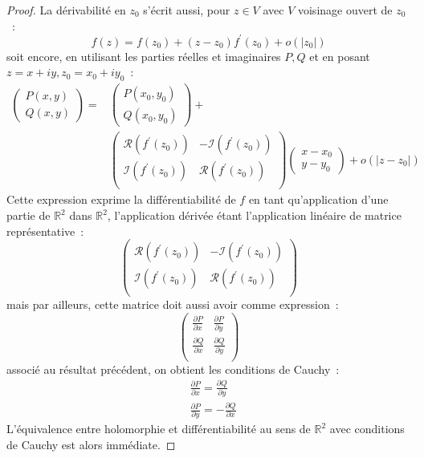 \begin{proof}
La dérivabilité en $z_0$ s'écrit aussi, pour $z \in V$ avec $V$ voisinage ouvert de $z_0$~:
\[
f(z) = f(z_0) +(z-z_0)f^\prime(z_0) + o(|z_0|)
\]
soit encore, en utilisant les parties réelles et imaginaires $P,Q$ et en posant $z=x+iy, z_0 = x_0 + i y_0$~:
\begin{align*}
\left (
\begin{array}{l}
P(x,y) \\
Q(x,y)
\end{array}
\right ) = &
\left (
\begin{array}{l}
P(x_0,y_0) \\
Q(x_0,y_0)
\end{array}
\right )
+ \\
&\left (
\begin{array}{ll}
\mathcal{R}(f^\prime(z_0)) & -\mathcal{I}(f^\prime(z_0)) \\
\mathcal{I}(f^\prime(z_0)) & \mathcal{R}(f^\prime(z_0)) \\
\end{array}
\right )
\left (
\begin{array}{l}
x-x_0 \\
y-y_0
\end{array}
\right ) +
o(|z-z_0|)
\end{align*}
Cette expression exprime la différentiabilité de $f$ en tant
qu'application d'une partie de $\mathbb{R}^2$ dans $\mathbb{R}^2$,
l'application dérivée étant l'application linéaire de matrice
représentative~:
\[
\left (
\begin{array}{ll}
\mathcal{R}(f^\prime(z_0)) & -\mathcal{I}(f^\prime(z_0)) \\
\mathcal{I}(f^\prime(z_0)) & \mathcal{R}(f^\prime(z_0)) \\
\end{array}
\right )
\]
mais par ailleurs, cette matrice doit aussi avoir comme expression~:
\[
\left (
\begin{array}{ll}
\frac{\partial P}{\partial x} & \frac{\partial P}{\partial y} \\
\frac{\partial Q}{\partial x} & \frac{\partial Q}{\partial y} \\
\end{array}
\right )
\]
associé au résultat précédent, on obtient les conditions de Cauchy~:
\begin{align*}
&\frac{\partial P}{\partial x} = \frac{\partial Q}{\partial y} \\
&\frac{\partial P}{\partial y} = - \frac{\partial Q}{\partial x}
\end{align*}
L'équivalence entre holomorphie et différentiabilité au sens de
$\mathbb{R}^2$ avec conditions de Cauchy est alors immédiate.
\end{proof}

